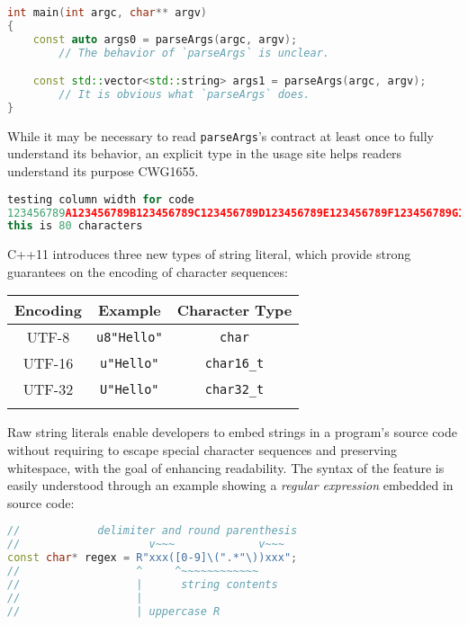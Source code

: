 \documentclass[twoside,10pt,letterpaper,usenames]{newstyle-PearsonGeneric-7-38}
\let\Begin\begin
\let\End\end
\begin{document}
\begin{lstlisting}[language=C++, caption={missing caption}, label={testlabel}, frame=tb]
int main(int argc, char** argv)
{
    const auto args0 = parseArgs(argc, argv);
        // The behavior of `parseArgs` is unclear.

    const std::vector<std::string> args1 = parseArgs(argc, argv);
        // It is obvious what `parseArgs` does.
}
\end{lstlisting}
    

While it may be necessary to read \texttt{parseArgs}'s contract at least
once to fully understand its behavior, an explicit type in the usage
site helps readers understand its purpose CWG1655.

\begin{lstlisting}[language=C++, caption={missing caption}, label={testlabel}, frame=tb]
testing column width for code
123456789A123456789B123456789C123456789D123456789E123456789F123456789G123456789H
this is 80 characters
\end{lstlisting}
    

C++11 introduces three new types of string literal, which provide strong
guarantees on the encoding of character sequences:

\Begin{center}
\Begin{tabular}{c|c|c}
\thickhline

\textbf{Encoding} & \textbf{Example} & \textbf{Character Type} \\ \hline
UTF-8 & \texttt{u8"Hello"} & \texttt{char} \\ \hline UTF-16 &
\texttt{u"Hello"} & \texttt{char16\_t} \\ \hline UTF-32 &
\texttt{U"Hello"} & \texttt{char32\_t} \\

\thickhline
\End{tabular}
\End{center}

Raw string literals enable developers to embed strings in a program's
source code without requiring to escape special character sequences and
preserving whitespace, with the goal of enhancing readability. The
syntax of the feature is easily understood through an example showing a
\emph{regular expression} embedded in source code:

\begin{lstlisting}[language=C++, caption={missing caption}, label={testlabel}, frame=tb]
//            delimiter and round parenthesis
//                    v~~~             v~~~
const char* regex = R"xxx([0-9]\(".*"\))xxx";
//                  ^     ^~~~~~~~~~~~~
//                  |      string contents
//                  |
//                  | uppercase R
\end{lstlisting}
    
\end{document}
